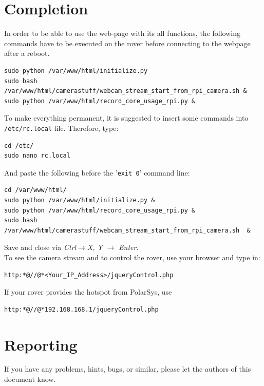 \section{Completion}
In order to be able to use the web-page with its all functions, the following commands have to be executed on the rover before connecting to the webpage after a reboot.
\begin{lstlisting}
sudo python /var/www/html/initialize.py
sudo bash /var/www/html/camerastuff/webcam_stream_start_from_rpi_camera.sh &
sudo python /var/www/html/record_core_usage_rpi.py &
\end{lstlisting}
To make everything permanent, it is suggested to insert some commands into \texttt{/etc/rc.local} file. Therefore, type:
\begin{lstlisting}
cd /etc/
sudo nano rc.local
\end{lstlisting}
And paste the following before the '\texttt{exit 0}' command line: 
\begin{lstlisting}
cd /var/www/html/
sudo python /var/www/html/initialize.py &
sudo python /var/www/html/record_core_usage_rpi.py &
sudo bash /var/www/html/camerastuff/webcam_stream_start_from_rpi_camera.sh  &
\end{lstlisting}
Save and close via  \textit{Ctrl}$\rightarrow$\textit{X, Y }$\rightarrow$ \textit{Enter}.\\
To see the camera stream and to control the rover, use your browser and type in:
\begin{lstlisting}[label={lst:1}]
http:*@//@*<Your_IP_Address>/jqueryControl.php
\end{lstlisting}
If your rover provides the hotspot from PolarSys, use
\begin{lstlisting}[label={lst:partWrkflw}]
http:*@//@*192.168.168.1/jqueryControl.php
\end{lstlisting}
\section{Reporting}
If you have any problems, hints, bugs, or similar, please let the authors of this document know.
